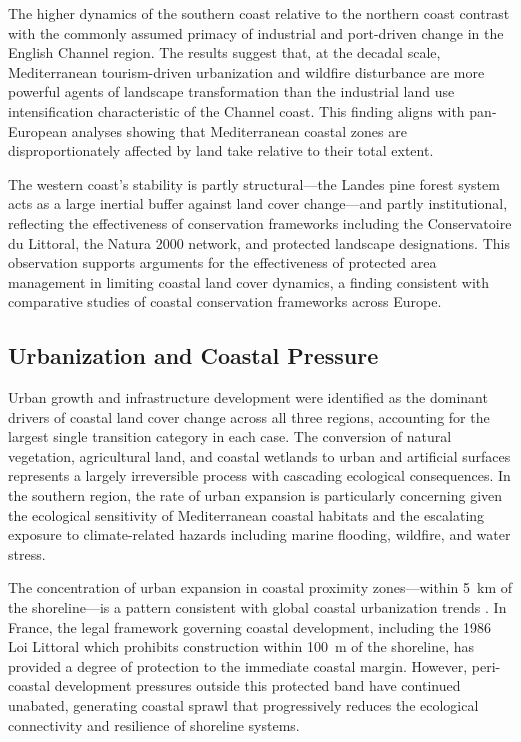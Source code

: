 \documentclass[coasts,article,accept,pdftex,moreauthors]{Definitions/mdpi}
\begin{document}
The higher dynamics of the southern coast relative to the northern coast contrast with the commonly assumed primacy of industrial and port-driven change in the English Channel region. The results suggest that, at the decadal scale, Mediterranean tourism-driven urbanization and wildfire disturbance are more powerful agents of landscape transformation than the industrial land use intensification characteristic of the Channel coast. This finding aligns with pan-European analyses showing that Mediterranean coastal zones are disproportionately affected by land take relative to their total extent.



The western coast's stability is partly structural—the Landes pine forest system acts as a large inertial buffer against land cover change—and partly institutional, reflecting the effectiveness of conservation frameworks including the Conservatoire du Littoral, the Natura 2000 network, and protected landscape designations. This observation supports arguments for the effectiveness of protected area management in limiting coastal land cover dynamics, a finding consistent with comparative studies of coastal conservation frameworks across Europe.

\subsection{Urbanization and Coastal Pressure}

Urban growth and infrastructure development were identified as the dominant drivers of coastal land cover change across all three regions, accounting for the largest single transition category in each case. The conversion of natural vegetation, agricultural land, and coastal wetlands to urban and artificial surfaces represents a largely irreversible process with cascading ecological consequences. In the southern region, the rate of urban expansion is particularly concerning given the ecological sensitivity of Mediterranean coastal habitats and the escalating exposure to climate-related hazards including marine flooding, wildfire, and water stress.

The concentration of urban expansion in coastal proximity zones—within 5~km of the shoreline—is a pattern consistent with global coastal urbanization trends \citep{FutureUrban2020}. In France, the legal framework governing coastal development, including the 1986 Loi Littoral which prohibits construction within 100~m of the shoreline, has provided a degree of protection to the immediate coastal margin. However, peri-coastal development pressures outside this protected band have continued unabated, generating coastal sprawl that progressively reduces the ecological connectivity and resilience of shoreline systems.
\end{document}

